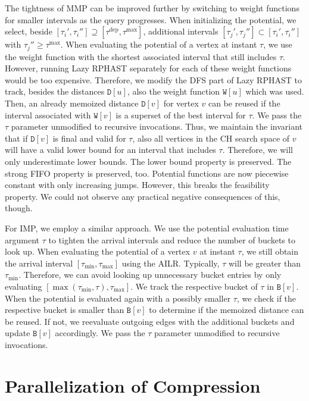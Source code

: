\documentclass[a4paper,UKenglish,cleveref, autoref, thm-restate]{lipics-v2021}
\newcommand*{\tdep}{\tau^{\operatorname{dep}}}
\newcommand*{\tmax}{\tau^{\max}}
\begin{document}
The tightness of MMP can be improved further by switching to weight functions for smaller intervals as the query progresses.
When initializing the potential, we select, beside $[\tau_i', \tau_i''] \supseteq [\tdep,\tmax]$, additional intervals $[\tau_j', \tau_j''] \subset [\tau_i', \tau_i'']$ with $\tau_j'' \geq \tmax$.
When evaluating the potential of a vertex at instant $\tau$, we use the weight function with the shortest associated interval that still includes $\tau$.
However, running Lazy RPHAST separately for each of these weight functions would be too expensive.
Therefore, we modify the DFS part of Lazy RPHAST to track, besides the distances $\mathtt{D}[u]$, also the weight function $\mathtt{W}[u]$ which was used.
Then, an already memoized distance $\mathtt{D}[v]$ for vertex $v$ can be reused if the interval associated with $\mathtt{W}[v]$ is a superset of the best interval for $\tau$.
We pass the $\tau$ parameter unmodified to recursive invocations.
Thus, we maintain the invariant that if $\mathtt{D}[v]$ is final and valid for $\tau$, also all vertices in the CH search space of $v$ will have a valid lower bound for an interval that includes $\tau$.
Therefore, we will only underestimate lower bounds.
The lower bound property is preserved.
The strong FIFO property is preserved, too.
Potential functions are now piecewise constant with only increasing jumps.
However, this breaks the feasibility property.
We could not observe any practical negative consequences of this, though.

For IMP, we employ a similar approach.
We use the potential evaluation time argument $\tau$ to tighten the arrival intervals and reduce the number of buckets to look up.
When evaluating the potential of a vertex $v$ at instant $\tau$, we still obtain the arrival interval $[\tau_{\min}, \tau_{\max}]$ using the AILR.
Typically, $\tau$ will be greater than $\tau_{\min}$.
Therefore, we can avoid looking up unnecessary bucket entries by only evaluating $[\max(\tau_{\min}, \tau), \tau_{\max}]$.
We track the respective bucket of $\tau$ in $\mathtt{B}[v]$.
When the potential is evaluated again with a possibly smaller $\tau$, we check if the respective bucket is smaller than $\mathtt{B}[v]$ to determine if the memoized distance can be reused.
If not, we reevaluate outgoing edges with the additional buckets and update $\mathtt{B}[v]$ accordingly.
We pass the $\tau$ parameter unmodified to recursive invocations.

\section{Parallelization of Compression}\label{sec:appendix:parallelization}
\end{document}
